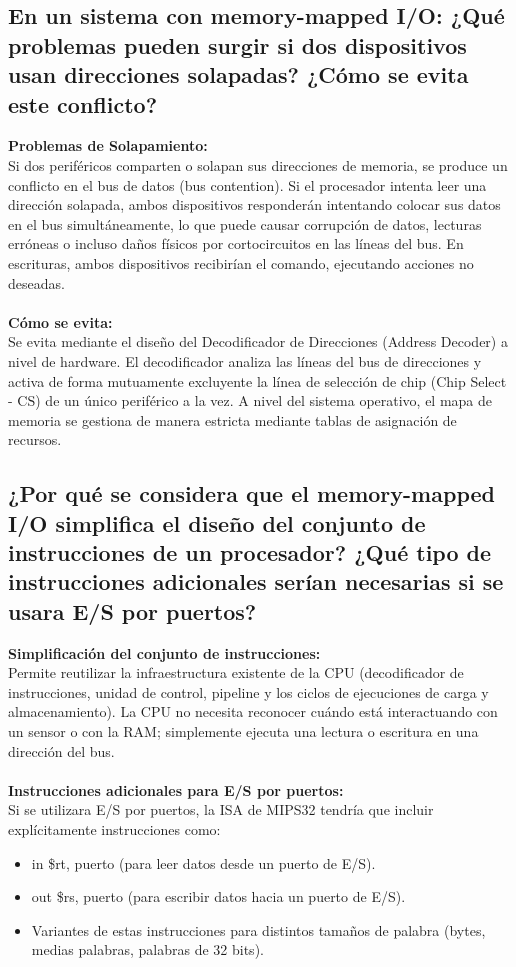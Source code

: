 \documentclass[12pt, a4paper]{article}
\begin{document}
\subsection{En un sistema con memory-mapped I/O: ¿Qué problemas pueden surgir si dos dispositivos usan direcciones solapadas? ¿Cómo se evita este conflicto?}
   \textbf{ Problemas de Solapamiento:}\\
        Si dos periféricos comparten o solapan sus direcciones de memoria, se produce un conflicto en el bus de datos (bus contention). Si el procesador intenta leer una dirección solapada, ambos dispositivos responderán intentando colocar sus datos en el bus simultáneamente, lo que puede causar corrupción de datos, lecturas erróneas o incluso daños físicos por cortocircuitos en las líneas del bus. En escrituras, ambos dispositivos recibirían el comando, ejecutando acciones no deseadas.\\\\
    \textbf{Cómo se evita:}\\
        Se evita mediante el diseño del Decodificador de Direcciones (Address Decoder) a nivel de hardware. El decodificador analiza las líneas del bus de direcciones y activa de forma mutuamente excluyente la línea de selección de chip (Chip Select - $\text{CS}$) de un único periférico a la vez. A nivel del sistema operativo, el mapa de memoria se gestiona de manera estricta mediante tablas de asignación de recursos.
   
\subsection{¿Por qué se considera que el memory-mapped I/O simplifica el diseño del conjunto de instrucciones de un procesador? ¿Qué tipo de instrucciones adicionales serían necesarias si se usara E/S por puertos?}   
    \textbf{Simplificación del conjunto de instrucciones:}\\
        Permite reutilizar la infraestructura existente de la CPU (decodificador de instrucciones, unidad de control, pipeline y los ciclos de ejecuciones de carga y almacenamiento). La CPU no necesita reconocer cuándo está interactuando con un sensor o con la RAM; simplemente ejecuta una lectura o escritura en una dirección del bus.\\\\
    \textbf{Instrucciones adicionales para E/S por puertos:}\\
        Si se utilizara E/S por puertos, la ISA de MIPS32 tendría que incluir explícitamente instrucciones como:
        \begin{itemize}
            \item in \$rt, puerto (para leer datos desde un puerto de E/S).
            \item out \$rs, puerto (para escribir datos hacia un puerto de E/S).
            \item Variantes de estas instrucciones para distintos tamaños de palabra (bytes, medias palabras, palabras de 32 bits).
        \end{itemize}
\end{document}
